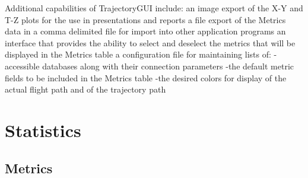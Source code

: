 \documentclass[]{article}
\begin{document}
Additional capabilities of TrajectoryGUI include:
an image export of the X-Y and T-Z plots for the use in presentations and reports
a file export of the Metrics data in a comma delimited file for import into other application programs
an interface that provides the ability to select and deselect the metrics that will be displayed in the Metrics table
a configuration file for maintaining lists of:
-accessible databases along with their connection parameters
-the default metric fields to be included in the Metrics table
-the desired colors for display of the actual flight path and of the trajectory path


\section{Statistics}
\label{statisitics}

\subsection{Metrics}
\label{metrics}
\end{document}
